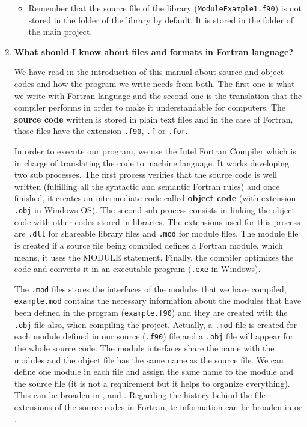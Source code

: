 \begin{enumerate}
\begin{IN}
\begin{itemize}
            \item Remember that the source file of the library (\texttt{ModuleExample1.f90}) is not stored in the folder of the library by default. It is stored in the folder of the main project.
        \end{itemize}
    \end{IN}

    

	
    \FloatBarrier
    \item \textbf{What should I know about files and formats in Fortran language?}
    
    We have read in the introduction of this manual about source and object codes and how the program we write needs from both. The first one is what we write with Fortran language and the second one is the translation that the compiler performs in order to make it understandable for computers. The \textbf{source code} written is stored in plain text files and in the case of Fortran, those files have the extension \texttt{.f90}, \texttt{.f} or \texttt{.for}. 
    
    \newpage
    In order to execute our program, we use the Intel\textregistered \hspace{0.1cm} Fortran Compiler which is in charge of translating the code to machine language. It works developing two sub processes. The first process verifies that the source code is well written (fulfilling all the syntactic and semantic Fortran rules) and once finished, it creates an intermediate code called \textbf{object code} (with extension \texttt{.obj} in Windows OS). The second sub process consists in linking the object code with other codes stored in libraries. The extensions used for this process are \texttt{.dll} for shareable library files and \texttt{.mod} for module files. The module file is created if a source file being compiled defines a Fortran module, which means, it uses the MODULE statement. Finally, the compiler optimizes the code and converts it in an executable program (\texttt{.exe} in Windows).
    
    The \texttt{.mod} files stores the interfaces of the modules that we have compiled, \texttt{example.mod} contains the necessary information about the modules that have been defined in the program (\texttt{example.f90}) and they are created with the \texttt{.obj} file also, when compiling the project. Actually, a \texttt{.mod} file is created for each module defined in our source (\texttt{.f90}) file and a \texttt{.obj} file will appear for the whole source code. The module interfaces share the name with the modules and the object file has the same name as the source file. We can define one module in each file and assign the same name to the module and the source file (it is not a requirement but it helps to organize everything). This can be broaden in \citep{mod1}, \citet{mod2} and \citep{mod3}. Regarding the history behind the file extensions of the source codes in Fortran, te information can be broaden in \citet{f90} or \citet{f902}.
	    

\end{enumerate}
